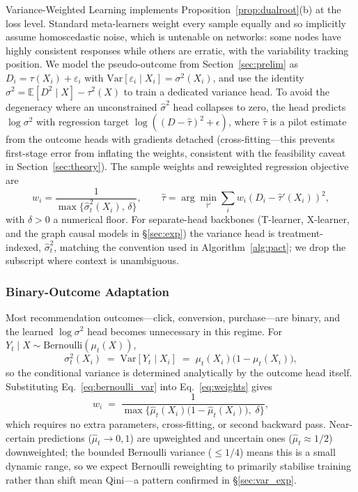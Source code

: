 \documentclass[sigconf,anonymous,review]{acmart}
\begin{document}
Variance-Weighted Learning implements Proposition~\ref{prop:dualroot}(b) at the loss level. Standard meta-learners weight every sample equally and so implicitly assume homoscedastic noise, which is untenable on networks: some nodes have highly consistent responses while others are erratic, with the variability tracking position. We model the pseudo-outcome from Section~\ref{sec:prelim} as $D_i = \tau(X_i) + \varepsilon_i$ with $\mathrm{Var}[\varepsilon_i \mid X_i] = \sigma^2(X_i)$, and use the identity $\sigma^2 = \mathbb{E}[D^2 \mid X] - \tau^2(X)$ to train a dedicated variance head. To avoid the degeneracy where an unconstrained $\hat\sigma^2$ head collapses to zero, the head predicts $\log\sigma^2$ with regression target $\log((D - \hat\tau)^2 + \epsilon)$, where $\hat\tau$ is a pilot estimate from the outcome heads with gradients detached (cross-fitting---this prevents first-stage error from inflating the weights, consistent with the feasibility caveat in Section~\ref{sec:theory}). The sample weights and reweighted regression objective are
\begin{equation}\label{eq:weights}
    w_i = \frac{1}{\max\{\hat\sigma^2_t(X_i),\, \delta\}}, \qquad \hat\tau = \arg\min_{\hat\tau'} \sum_i w_i (D_i - \hat\tau'(X_i))^2,
\end{equation}
with $\delta > 0$ a numerical floor. For separate-head backbones (T-learner, X-learner, and the graph causal models in §\ref{sec:exp}) the variance head is treatment-indexed, $\hat\sigma^2_t$, matching the convention used in Algorithm~\ref{alg:pact}; we drop the subscript where context is unambiguous.

\subsubsection*{Binary-Outcome Adaptation}
\label{sec:var_binary}
Most recommendation outcomes---click, conversion, purchase---are binary, and the learned $\log\sigma^2$ head becomes unnecessary in this regime. For $Y_t \mid X \sim \mathrm{Bernoulli}(\mu_t(X))$,
\begin{equation}\label{eq:bernoulli_var}
    \sigma^2_t(X_i) \;=\; \mathrm{Var}[Y_t \mid X_i] \;=\; \mu_t(X_i)\bigl(1 - \mu_t(X_i)\bigr),
\end{equation}
so the conditional variance is determined analytically by the outcome head itself. Substituting Eq.~\ref{eq:bernoulli_var} into Eq.~\ref{eq:weights} gives
\begin{equation*}
    w_i \;=\; \frac{1}{\max\bigl\{\hat\mu_t(X_i)\bigl(1 - \hat\mu_t(X_i)\bigr),\; \delta\bigr\}},
\end{equation*}
which requires no extra parameters, cross-fitting, or second backward pass. Near-certain predictions ($\hat\mu_t \to 0, 1$) are upweighted and uncertain ones ($\hat\mu_t \approx 1/2$) downweighted; the bounded Bernoulli variance ($\leq 1/4$) means this is a small dynamic range, so we expect Bernoulli reweighting to primarily stabilise training rather than shift mean Qini---a pattern confirmed in §\ref{sec:var_exp}.
\end{document}
